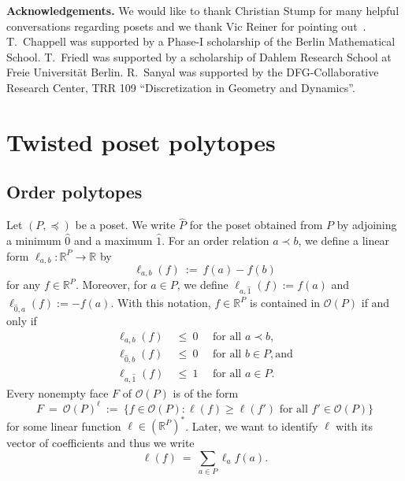 \documentclass[11pt]{amsart}
\theoremstyle{definition}
\begin{document}
\textbf{Acknowledgements.} We would like to thank Christian Stump for many
helpful conversations regarding posets and we thank Vic Reiner for pointing
out~\cite{MR}.  T.~Chappell was supported by a Phase-I scholarship of the
Berlin Mathematical School.  T.~Friedl was supported by a scholarship of
Dahlem Research School at Freie Universit\"at Berlin.  R.~Sanyal was supported
by the DFG-Collaborative Research Center, TRR 109 ``Discretization in Geometry
and Dynamics''.

\tableofcontents

\section{Twisted poset polytopes}\label{sec:TO}

\subsection{Order polytopes}
Let $({P},\preceq)$ be a poset. We write ${\widehat{P}}$ for the poset obtained from
${P}$ by adjoining a minimum ${\widehat{0}}$ and a maximum ${\widehat{1}}$. For an order
relation $a \prec b$, we define a linear form $\ell_{a,b} :  {\mathbb{R}}^{P} \rightarrow
{\mathbb{R}}$ by
\[
    \ell_{a,b}(f) \ := \ f(a) - f(b)
\]
for any $f \in {\mathbb{R}}^{P}$.  Moreover, for $a \in {P}$, we define $\ell_{a,{\widehat{1}}}(f)
:= f(a)$ and $\ell_{{\widehat{0}},a}(f) := -f(a)$. With this notation, $f \in {\mathbb{R}}^{P}$
is contained in ${\mathcal{O}({P})}$ if and only if
\begin{equation}\label{eqn:ord_poly}
\begin{aligned}
        \ell_{a,b}(f) & \ \le \ 0 \quad \text{ for all } a \prec b,\\
        \ell_{{\widehat{0}},b}(f) & \ \le \ 0 \quad \text{ for all } b  \in {P}, \text{
        and}\\
        \ell_{a,{\widehat{1}}}(f) & \ \le \ 1 \quad \text{ for all } a  \in {P}.
\end{aligned}
\end{equation}
Every nonempty face $F$ of ${\mathcal{O}({P})}$ is of the form
\[
    F \ = \ {\mathcal{O}({P})}^\ell \ := \ \{ f \in {\mathcal{O}({P})} : \ell(f) \ge
    \ell(f') \text{ for all } f' \in {\mathcal{O}({P})} \}
\]
for some linear function $\ell \in ({\mathbb{R}}^{P})^*$. Later, we want to identify
$\ell$ with its vector of coefficients and thus we write
\[
    \ell(f) \ = \ \sum_{a \in {P}} \ell_a f(a).
\]
\end{document}
